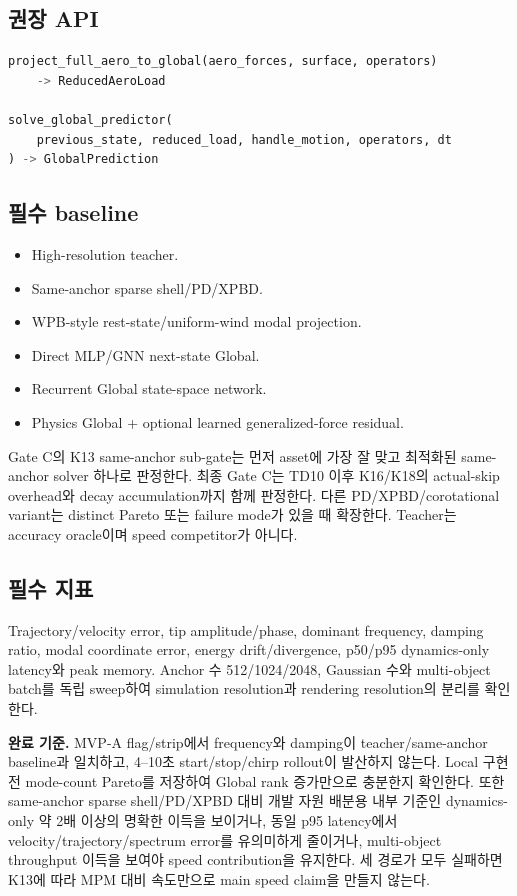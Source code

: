 \documentclass[10pt,a4paper]{article}
\begin{document}
\subsection*{권장 API}

\begin{lstlisting}[language=Python]
project_full_aero_to_global(aero_forces, surface, operators)
    -> ReducedAeroLoad

solve_global_predictor(
    previous_state, reduced_load, handle_motion, operators, dt
) -> GlobalPrediction
\end{lstlisting}

\subsection*{필수 baseline}

\begin{itemize}
  \item High-resolution teacher.
  \item Same-anchor sparse shell/PD/XPBD.
  \item WPB-style rest-state/uniform-wind modal projection.
  \item Direct MLP/GNN next-state Global.
  \item Recurrent Global state-space network.
  \item Physics Global + optional learned generalized-force residual.
\end{itemize}

Gate C의 K13 same-anchor sub-gate는 먼저 asset에 가장 잘 맞고
최적화된 same-anchor solver 하나로 판정한다.
최종 Gate C는 TD10 이후 K16/K18의 actual-skip overhead와 decay accumulation까지 함께 판정한다.
다른 PD/XPBD/corotational variant는 distinct Pareto 또는 failure mode가 있을 때 확장한다.
Teacher는 accuracy oracle이며 speed competitor가 아니다.

\subsection*{필수 지표}

Trajectory/velocity error, tip amplitude/phase, dominant frequency, damping ratio,
modal coordinate error, energy drift/divergence, p50/p95 dynamics-only latency와 peak memory.
Anchor 수 512/1024/2048, Gaussian 수와 multi-object batch를 독립 sweep하여
simulation resolution과 rendering resolution의 분리를 확인한다.

\textbf{완료 기준.}
MVP-A flag/strip에서 frequency와 damping이 teacher/same-anchor baseline과 일치하고,
4--10초 start/stop/chirp rollout이 발산하지 않는다.
Local 구현 전 mode-count Pareto를 저장하여 Global rank 증가만으로 충분한지 확인한다.
또한 same-anchor sparse shell/PD/XPBD 대비 개발 자원 배분용 내부 기준인
dynamics-only 약 2배 이상의 명확한 이득을 보이거나,
동일 p95 latency에서 velocity/trajectory/spectrum error를 유의미하게 줄이거나,
multi-object throughput 이득을 보여야 speed contribution을 유지한다.
세 경로가 모두 실패하면 K13에 따라 MPM 대비 속도만으로 main speed claim을 만들지 않는다.
\end{document}
